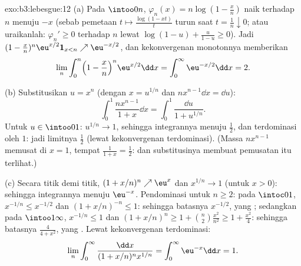 \begin{solution}{exo:b3:lebesgue:12}
(a) Pada $\intoo0n$, $\varphi_n(x) = n\log(1 - \frac xn)$
naik terhadap $n$ menuju $-x$ (sebab pemetaan $t \mapsto
\frac{\log(1 - xt)}{t}$ turun saat $t = \frac1n
\downarrow 0$; atau uraikanlah: $\varphi_{n}' \geq 0$ terhadap $n$ lewat
$\log(1-u) + \frac{u}{1-u} \geq 0$). Jadi $(1 -
\frac xn)^n\eu^{x/2}\mathbf 1_{x<n} \nearrow
\eu^{-x/2}$, dan kekonvergenan monotonnya memberikan
\[
\lim_n\int_0^n\Bigl(1 - \frac xn\Bigr)^n\eu^{x/2}\dd x =
\int_0^\infty\eu^{-x/2}\dd x = 2 .
\]

(b) Substitusikan $u = x^n$ (dengan $x = u^{1/n}$ dan $n x^{n-1}\dd x =
\dd u$):
\[
\int_0^1\frac{nx^{n-1}}{1 + x}\dd x =
\int_0^1\frac{\dd u}{1 + u^{1/n}} .
\]
Untuk $u \in \intoo01$: $u^{1/n} \to 1$, sehingga integrannya
menuju $\frac12$, dan terdominasi oleh $1$: jadi limitnya
$\frac12$ (lewat kekonvergenan terdominasi). (Massa $nx^{n-1}$ memusat di $x
= 1$, tempat $\frac1{1+x} = \frac12$: dan substitusinya membuat
pemusatan itu terlihat.)

(c) Secara titik demi titik, $(1 + x/n)^n \nearrow \eu^x$ dan $x^{1/n} \to
1$ (untuk $x > 0$): sehingga integrannya menuju $\eu^{-x}$. Pendominasi
untuk $n \geq 2$: pada $\intoc01$, $x^{-1/n} \leq x^{-1/2}$ dan
$(1 + x/n)^{-n} \leq 1$: sehingga batasnya $x^{-1/2}$, yang ; sedangkan pada
$\intoo1\infty$, $x^{-1/n} \leq 1$ dan $(1 + x/n)^n \geq 1 +
\binom n2\frac{x^2}{n^2} \geq 1 + \frac{x^2}4$: sehingga batasnya
$\frac{4}{4 + x^2}$, yang . Lewat kekonvergenan terdominasi:
\[
\lim_n\int_0^\infty\frac{\dd x}{(1 + x/n)^nx^{1/n}} =
\int_0^\infty\eu^{-x}\dd x = 1 .
\]
\end{solution}

